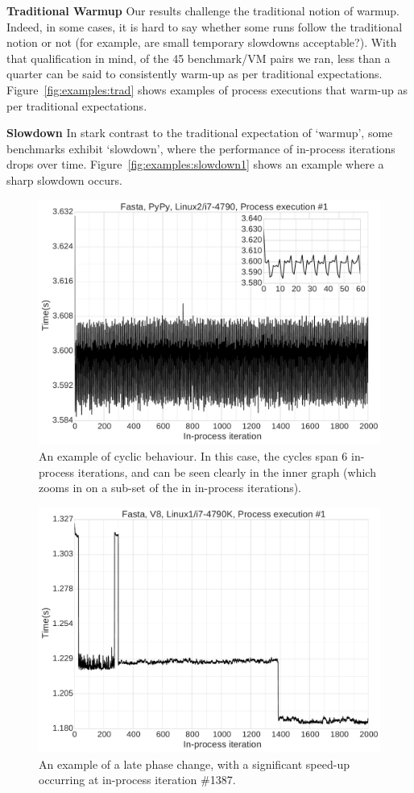 \documentclass[preprint,numbers,10pt]{sigplanconf}
\begin{document}
\textbf{Traditional Warmup} Our results challenge the traditional notion of
warmup. Indeed, in some cases, it is hard to say whether some runs follow the
traditional notion or not (for example, are small temporary slowdowns
acceptable?). With that qualification in mind, of the 45 benchmark/VM pairs we ran,
less than a quarter can be said to consistently warm-up as per traditional
expectations. Figure~\ref{fig:examples:trad} shows examples of process executions that
warm-up as per traditional expectations.


\textbf{Slowdown} \label{sub:slowdowns}
In stark contrast to the traditional expectation of `warmup', some benchmarks
exhibit `slowdown', where the performance of
in-process iterations drops over time. Figure~\ref{fig:examples:slowdown1} shows
an example where a sharp slowdown occurs.

\begin{figure}[tbp]
\includegraphics[width=.475\textwidth]{examples/cycles1}
\caption{An example of cyclic behaviour. In this case, the cycles span 6 in-process iterations,
and can be seen clearly in the inner graph (which zooms in on a sub-set of the in in-process
iterations).}
\label{fig:examples:cycles}
\end{figure}

\begin{figure}[tbp]
\includegraphics[width=.475\textwidth]{examples/slow_warmup1}
\caption{An example of a late phase change, with a significant speed-up occurring
at in-process iteration \#1387.}
\label{fig:examples:late1}
\end{figure}
\end{document}
